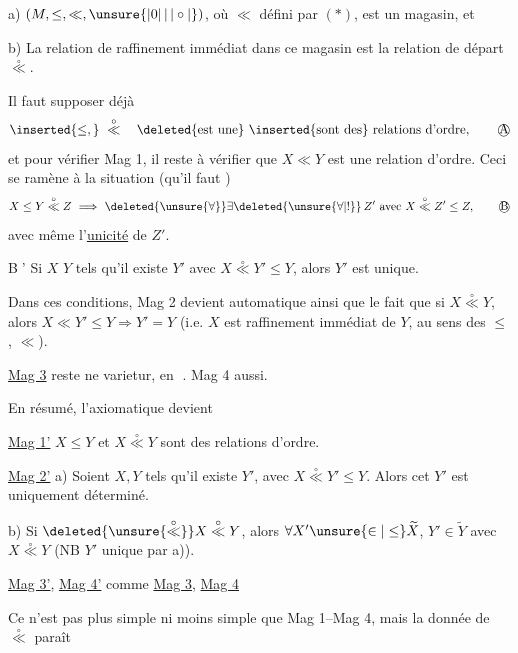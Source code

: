 
 a) $(M,\leq,\ll,\unsure{|0|\,|\,|\circ|})$, où $\ll$ défini par $(\ast)$, est un magasin, et

 b) La relation de raffinement immédiat dans ce magasin est la relation de départ $\overset{\circ}{\ll}$.

Il faut supposer déjà
\[
\inserted{\leq,}\ \overset{\circ}{\ll}\quad\deleted{\text{est une}}\ \inserted{\text{sont des}}\ \text{relations d'ordre},\tag*{\textcircled{A}}
\]
et pour vérifier Mag 1, il reste à vérifier que $X\ll Y$ est une relation d'ordre. Ceci se ramène à la situation (qu'il faut )
\[
X\leq Y\overset{\circ}{\ll}Z\ \Longrightarrow\ \deleted{\unsure{\forall}}\exists\deleted{\unsure{\forall|!}}\,Z'\text{ avec }X\overset{\circ}{\ll}Z'\leq Z,\tag*{\textcircled{B}}
\]
avec même l'\uline{unicité} de $Z'$.  

\textcircled{B'} Si $X$  $Y$ tels qu'il existe $Y'$ avec $X\overset{\circ}{\ll}Y'\leq Y$, alors $Y'$ est unique.

Dans ces conditions, Mag 2 devient automatique ainsi que le fait que si $X\overset{\circ}{\ll}Y$, alors   $X\ll Y'\leq Y\Longrightarrow Y'=Y$ (i.e. $X$ est raffinement immédiat de $Y$, au sens des  $\leq$, $\ll$).

\uline{Mag 3} reste ne varietur, en \textcircled{}. Mag 4 aussi.

En résumé, l'axiomatique devient

\uline{Mag 1'} $X\leq Y$ et $X\overset{\circ}{\ll}Y$ sont des relations d'ordre.

\uline{Mag 2'} a) Soient $X,Y$ tels qu'il existe $Y'$, avec $X\overset{\circ}{\ll}Y'\leq Y$. Alors cet $Y'$ est uniquement déterminé.

 b) Si $\deleted{\unsure{\overset{\circ}{\ll}}}X\overset{\circ}{\ll}Y$, alors $\forall X'\unsure{\in|\leq}\widetilde X$,  $Y'\in\widetilde Y$ avec $X\overset{\circ}{\ll}Y$ (NB $Y'$ unique par a)).

\uline{Mag 3'}, \uline{Mag 4'} comme \uline{Mag 3}, \uline{Mag 4}

Ce n'est pas plus simple ni moins simple que Mag 1--Mag 4, mais la donnée de $\overset{\circ}{\ll}$ paraît
